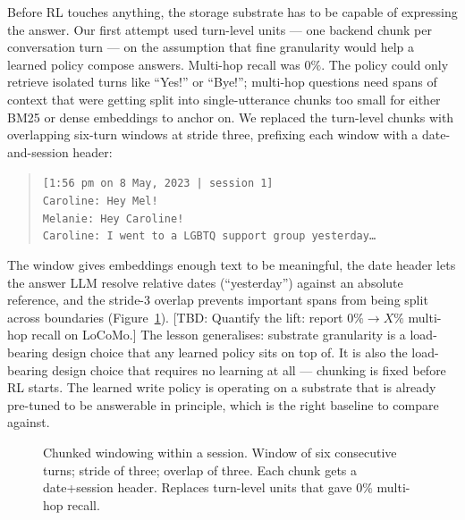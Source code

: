 \documentclass[11pt]{article}
\newcommand{\TBD}[1]{%
  \textcolor{red!80!black}{\textsf{[TBD: #1]}}}
\begin{document}
Before RL touches anything, the storage substrate has to be capable of
expressing the answer. Our first attempt used turn-level units --- one
backend chunk per conversation turn --- on the assumption that fine
granularity would help a learned policy compose answers. Multi-hop
recall was $0\%$. The policy could only retrieve isolated turns like
``Yes!'' or ``Bye!''; multi-hop questions need spans of context that
were getting split into single-utterance chunks too small for either
BM25 or dense embeddings to anchor on. We replaced the turn-level
chunks with overlapping six-turn windows at stride three, prefixing
each window with a date-and-session header:
\begin{quote}
\small\texttt{[1:56 pm on 8 May, 2023 | session 1]}\\
\texttt{Caroline: Hey Mel!}\\
\texttt{Melanie: Hey Caroline!}\\
\texttt{Caroline: I went to a LGBTQ support group yesterday\ldots}
\end{quote}
The window gives embeddings enough text to be meaningful, the date
header lets the answer LLM resolve relative dates (``yesterday'')
against an absolute reference, and the stride-3 overlap prevents
important spans from being split across boundaries
(Figure~\ref{fig:chunk}). \TBD{Quantify the lift: report
$0\% \to X\%$ multi-hop recall on LoCoMo.} The lesson generalises:
substrate granularity is a load-bearing design choice that any
learned policy sits on top of. It is also the load-bearing design
choice that requires no learning at all --- chunking is fixed before
RL starts. The learned write policy is operating on a substrate that
is already pre-tuned to be answerable in principle, which is the
right baseline to compare against.

\begin{figure}[h]
\centering
{}
\caption{Chunked windowing within a session. Window of six consecutive
turns; stride of three; overlap of three. Each chunk gets a date+session
header. Replaces turn-level units that gave 0\% multi-hop recall.}
\label{fig:chunk}
\end{figure}
\end{document}
